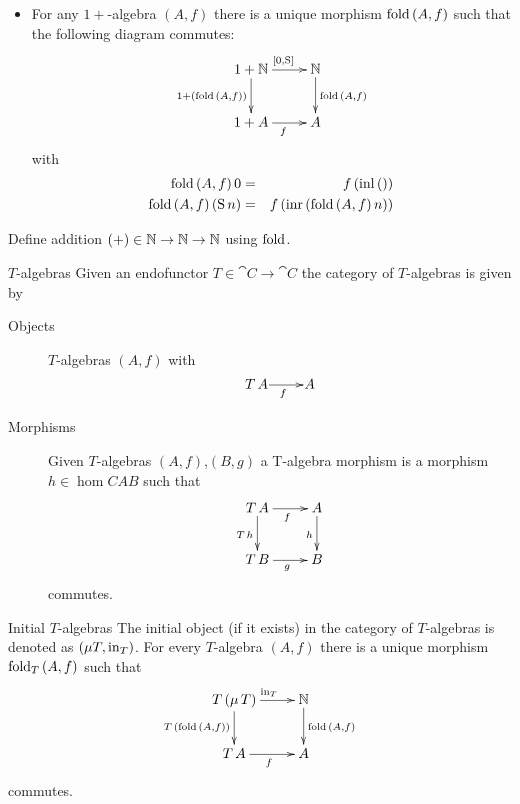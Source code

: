 \documentclass[handout]{beamer}
\begin{document}
\begin{frame}

  \begin{itemize}
  \item For any $1+$-algebra $(A,f)$ there is a unique morphism
    $\mathrm{fold}\,(A,f)$ such that the following diagram commutes:
    \[ \xymatrix{1+\Nat \ar[r]^{[0,\mathrm{S}]} \ar[d]_{1+(\fold\,(A,f))} & \Nat \ar[d]^{\fold\,(A,f)} \\
      1+A \ar[r]_f & A } \]
    with
    \begin{eqnarray*}
      \mathrm{fold}\,(A,f)\,0 & = & f\,(\mathrm{inl}\,()) \\
      \mathrm{fold}\,(A,f)\,(\mathrm{S}\,n) & = & f\,(\mathrm{inr}\,(\mathrm{fold}\,(A,f)\,n)) \\
    \end{eqnarray*}
  \end{itemize}


  \begin{exercise}
    Define addition $(+) \in \mathbb{N} \to \mathbb{N} \to \mathbb{N}$ using $\mathrm{fold}$.
  \end{exercise}

\end{frame}
\begin{frame}
  \begin{block}{$T$-algebras}
    Given an endofunctor $T\in\cat{C}\to\cat{C}$ the category 
    of $T$-algebras is given by
    \begin{description}
    \item[Objects] $T$-algebras $(A,f)$ with
      \[ \xymatrix@1{T\,A \ar[r]_f & A} \]

    \item[Morphisms] Given $T$-algebras $(A,f)$,$(B,g)$ a T-algebra morphism
      is a morphism $h\in\hom{C}{A}{B}$ such that
      \[ \xymatrix{T\,A \ar[r]_f\ar[d]_{T\,h} & A\ar[d]_h \\
        T\,B \ar[r]_g & B } \]
      commutes.
    \end{description}
  \end{block}
\end{frame}

\begin{frame}{}
  \begin{block}{Initial $T$-algebras}
    The initial object (if it exists) in the category of $T$-algebras
    is denoted as $(\mu T,\mathrm{in}_T)$. For every $T$-algebra $(A,f)$ there is a unique 
    morphism $\mathrm{fold}_T\,(A,f)$ such that
    \[ \xymatrix{T\,(\mu\,T) \ar[r]^{\inn_T} \ar[d]_{T\,(\fold\,(A,f))} & \Nat \ar[d]^{\fold\,(A,f)} \\
      T\,A \ar[r]_f & A } \]
    commutes.
  \end{block}

\end{frame}
\end{document}
